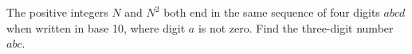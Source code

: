The positive integers $N$ and $N^2$ both end in the same sequence of four digits $abcd$ when written in base 10, where digit $a$ is not zero. Find the three-digit number $abc$.